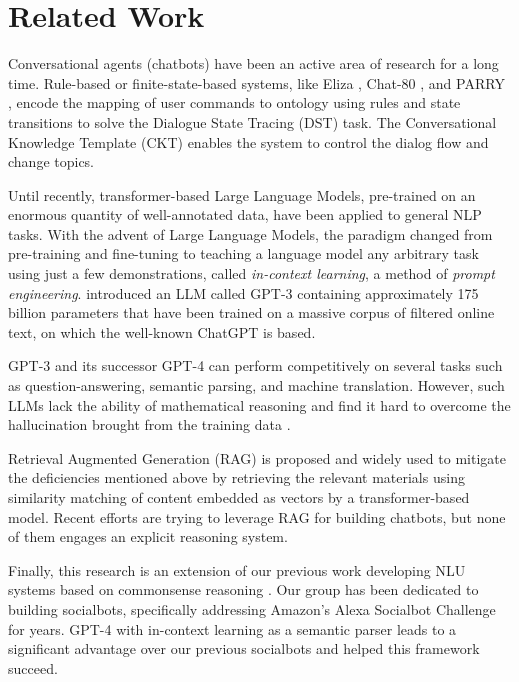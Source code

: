 \section{Related Work}
Conversational agents (chatbots) have been an active area of research for a long time.
Rule-based or finite-state-based systems, like Eliza \cite{eliza}, Chat-80 \cite{chat80}, and PARRY \cite{parry}, encode the mapping of user commands to ontology using rules and state transitions to solve the Dialogue State Tracing (DST) task.
The Conversational Knowledge Template (CKT) \cite{ckt} enables the system to control the dialog flow and change topics. 

Until recently, transformer-based Large Language Models, pre-trained on an enormous quantity of well-annotated data, have been applied to general NLP tasks. With the advent of Large Language Models, the paradigm changed from pre-training and fine-tuning \cite{pre_trained_transformers} to teaching a language model any arbitrary task using just a few demonstrations, called \textit{in-context learning}, a method of \textit{prompt engineering}. \cite{gpt3} introduced an LLM called GPT-3 containing approximately 175 billion parameters that have been trained on a massive corpus of filtered online text, on which the well-known ChatGPT is based.

GPT-3 and its successor GPT-4 \cite{gpt4} can perform competitively on several tasks such as question-answering, semantic parsing, and machine translation. However, such LLMs lack the ability of mathematical reasoning and find it hard to overcome the hallucination brought from the training data \cite{gpt3-scope,chain,chatgpt-critic}.  

Retrieval Augmented Generation (RAG) \cite{rag} is proposed and widely used to mitigate the deficiencies mentioned above by retrieving the relevant materials using similarity matching of content embedded as vectors by a transformer-based model.
Recent efforts \cite{ragchat1,ragchat2} are trying to leverage RAG for building chatbots, but none of them engages an explicit reasoning system.

Finally, this research is an extension of our previous work developing NLU systems based on commonsense reasoning \cite{ckt,rcc,concierge}. Our group has been dedicated to building socialbots, specifically addressing Amazon's Alexa Socialbot Challenge \cite{alexa} for years. GPT-4 with in-context learning as a semantic parser leads to a significant advantage over our previous socialbots and helped this framework succeed.